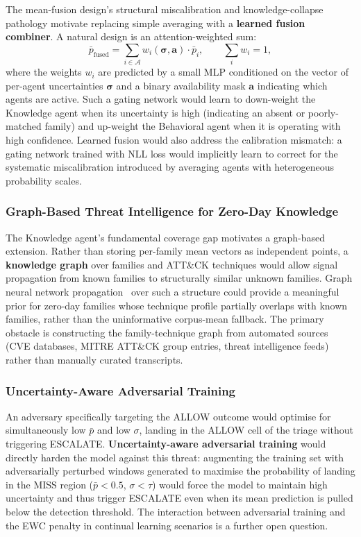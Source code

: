 \documentclass[journal]{IEEEtran}
\begin{document}
The mean-fusion design's structural miscalibration and knowledge-collapse pathology
motivate replacing simple averaging with a \textbf{learned fusion combiner}.
A natural design is an attention-weighted sum:
\begin{equation}
\bar{p}_{\mathrm{fused}} = \sum_{i \in \mathcal{A}}
    w_i(\boldsymbol{\sigma}, \mathbf{a}) \cdot \bar{p}_i,
\qquad \sum_{i} w_i = 1,
\label{eq:learned_fusion}
\end{equation}
where the weights $w_i$ are predicted by a small MLP conditioned on the vector of
per-agent uncertainties $\boldsymbol{\sigma}$ and a binary availability mask $\mathbf{a}$
indicating which agents are active.
Such a gating network would learn to down-weight the Knowledge agent when its uncertainty
is high (indicating an absent or poorly-matched family) and up-weight the Behavioral agent
when it is operating with high confidence.
Learned fusion would also address the calibration mismatch: a gating network trained with
NLL loss would implicitly learn to correct for the systematic miscalibration introduced by
averaging agents with heterogeneous probability scales.

\subsubsection{Graph-Based Threat Intelligence for Zero-Day Knowledge}

The Knowledge agent's fundamental coverage gap motivates a graph-based extension.
Rather than storing per-family mean vectors as independent points, a \textbf{knowledge
graph} over families and ATT\&CK techniques would allow signal propagation from known
families to structurally similar unknown families.
Graph neural network propagation~\cite{sun_malware_kg_2022} over such a structure could
provide a meaningful prior for zero-day families whose technique profile partially overlaps
with known families, rather than the uninformative corpus-mean fallback.
The primary obstacle is constructing the family-technique graph from automated sources
(CVE databases, MITRE ATT\&CK group entries, threat intelligence feeds) rather than
manually curated transcripts.

\subsubsection{Uncertainty-Aware Adversarial Training}

An adversary specifically targeting the ALLOW outcome would optimise for simultaneously
low $\bar{p}$ and low $\sigma$, landing in the ALLOW cell of the triage without
triggering ESCALATE.
\textbf{Uncertainty-aware adversarial training} would directly harden the model against
this threat: augmenting the training set with adversarially perturbed windows generated to
maximise the probability of landing in the MISS region ($\bar{p} < 0.5$,
$\sigma < \tau$) would force the model to maintain high uncertainty and thus trigger
ESCALATE even when its mean prediction is pulled below the detection threshold.
The interaction between adversarial training and the EWC penalty in continual learning
scenarios is a further open question.
\end{document}
